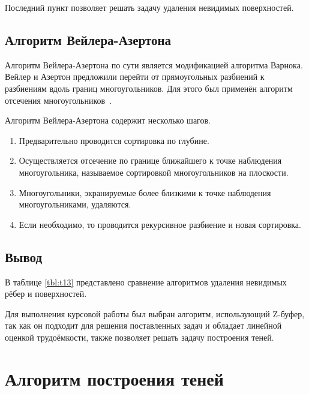 Последний пункт позволяет решать задачу удаления невидимых поверхностей.

\subsection{Алгоритм Вейлера-Азертона}

Алгоритм Вейлера-Азертона по сути является модификацией алгоритма Варнока. Вейлер и Азертон предложили перейти от прямоугольных разбиений к разбиениям вдоль границ многоугольников. Для этого был применён алгоритм отсечения многоугольников~\cite{rodjers}.

Алгоритм Вейлера-Азертона содержит несколько шагов.
\begin{enumerate}
	\item Предварительно проводится сортировка по глубине.
	\item Осуществляется отсечение по границе ближайшего к точке наблюдения многоугольника, называемое сортировкой многоугольников на плоскости.
	\item Многоугольники, экранируемые более близкими к точке наблюдения многоугольниками, удаляются.
	\item Если необходимо, то проводится рекурсивное разбиение и новая сортировка.
\end{enumerate} 

\subsection*{Вывод}

В таблице \ref{tbl:t13} представлено сравнение алгоритмов удаления невидимых рёбер и поверхностей.


Для выполнения курсовой работы был выбран алгоритм, использующий Z-буфер, так как он подходит для решения поставленных задач и обладает линейной оценкой трудоёмкости, также позволяет решать задачу построения теней.

\section{Алгоритм построения теней}

